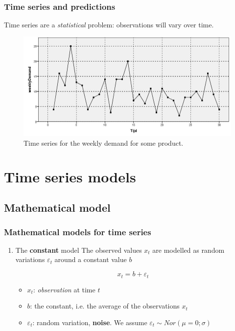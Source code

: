 \documentclass{beamer}
\begin{document}
\begin{frame}
  \frametitle{Time series and predictions}

  Time series are a \emph{statistical} problem: observations will vary over time.
  
  \begin{figure}
    \centering
    \includegraphics[width=\textwidth]{img/tijdreeks11}
    \caption{Time series for the weekly demand for some product.}
  \end{figure}
\end{frame}

\section{Time series models}

\subsection{Mathematical model}

\begin{frame}
  \frametitle{Mathematical models for time series}

  \begin{enumerate}
  \item The \textbf{constant} model
\vfill
The observed values $x_t$ are modelled as random variations $\varepsilon_t$ around a constant value $b$

\begin{equation}
x_{t} = b + \varepsilon_{t}
\label{eq:timeseries-constant}
\end{equation}

  \begin{itemize}
    \item $x_{t}$: \emph{observation} at time $t$
    \item $b$: the constant, i.e. the average of the observations $x_t$
    \item $\varepsilon_{t}$: random variation, \textbf{noise}. We assume $\varepsilon_{t} \sim Nor(\mu = 0; \sigma)$
  \end{itemize}
  \end{enumerate}
\end{frame}
\end{document}
